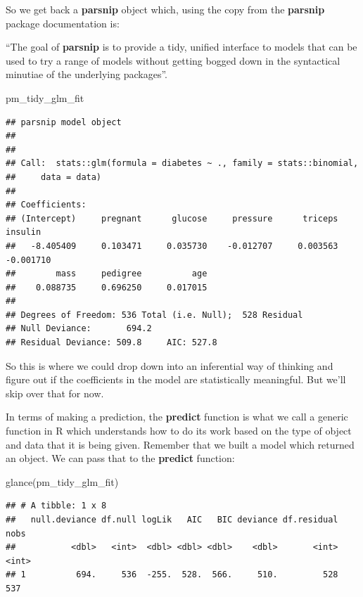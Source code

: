 \documentclass[
]{article}
\newenvironment{Shaded}{\begin{snugshade}}{\end{snugshade}}
\newcommand{\FunctionTok}[1]{\textcolor[rgb]{0.00,0.00,0.00}{#1}}
\newcommand{\NormalTok}[1]{#1}
\begin{document}
So we get back a \textbf{parsnip} object which, using the copy from the
\textbf{parsnip} package documentation is:

``The goal of \textbf{parsnip} is to provide a tidy, unified interface
to models that can be used to try a range of models without getting
bogged down in the syntactical minutiae of the underlying packages''.

\begin{Shaded}
\begin{Highlighting}[]
\NormalTok{pm\_tidy\_glm\_fit}
\end{Highlighting}
\end{Shaded}

\begin{verbatim}
## parsnip model object
## 
## 
## Call:  stats::glm(formula = diabetes ~ ., family = stats::binomial, 
##     data = data)
## 
## Coefficients:
## (Intercept)     pregnant      glucose     pressure      triceps      insulin  
##   -8.405409     0.103471     0.035730    -0.012707     0.003563    -0.001710  
##        mass     pedigree          age  
##    0.088735     0.696250     0.017015  
## 
## Degrees of Freedom: 536 Total (i.e. Null);  528 Residual
## Null Deviance:       694.2 
## Residual Deviance: 509.8     AIC: 527.8
\end{verbatim}

So this is where we could drop down into an inferential way of thinking
and figure out if the coefficients in the model are statistically
meaningful. But we'll skip over that for now.

In terms of making a prediction, the \textbf{predict} function is what
we call a generic function in R which understands how to do its work
based on the type of object and data that it is being given. Remember
that we built a model which returned an object. We can pass that to the
\textbf{predict} function:

\begin{Shaded}
\begin{Highlighting}[]
\FunctionTok{glance}\NormalTok{(pm\_tidy\_glm\_fit)}
\end{Highlighting}
\end{Shaded}

\begin{verbatim}
## # A tibble: 1 x 8
##   null.deviance df.null logLik   AIC   BIC deviance df.residual  nobs
##           <dbl>   <int>  <dbl> <dbl> <dbl>    <dbl>       <int> <int>
## 1          694.     536  -255.  528.  566.     510.         528   537
\end{verbatim}
\end{document}
